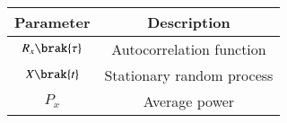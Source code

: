 \begin{tabular}{|c|c|}
	\hline
	\textbf{Parameter} & \textbf{Description} \\[6pt]
	\hline
     $R_x\brak{\tau}$ & Autocorrelation function \\
     \hline
     $ X\brak{t}$ & Stationary random process \\
    \hline
    $ P_x$ & Average power\\
    \hline
\end{tabular}

